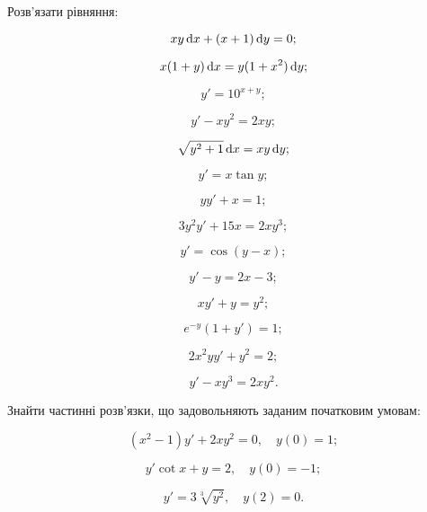 Розв'язати рівняння:
\begin{multicols}{2}
	\begin{problem}
		\[ x y \mathop{}\!\mathrm{d} x + (x + 1) \mathop{}\!\mathrm{d} y = 0; \]
	\end{problem}

	\begin{problem}
		\[ x (1 + y) \mathop{}\!\mathrm{d} x = y (1 + x^2) \mathop{}\!\mathrm{d} y; \]
	\end{problem}

	\begin{problem}
		\[ y' = 10^{x + y}; \]
	\end{problem}

	\begin{problem}
		\[ y' - x y^2 = 2 x y; \]
	\end{problem}

	\begin{problem}
		\[ \sqrt{y^2 + 1} \mathop{}\!\mathrm{d} x = x y \mathop{}\!\mathrm{d} y; \]
	\end{problem}

	\begin{problem}
		\[ y' = x \tan y; \]
	\end{problem}

	\begin{problem}
		\[ y y' + x = 1; \]
	\end{problem}

	\begin{problem}
		\[ 3 y^2 y' + 15 x = 2 x y^3; \]
	\end{problem}

	\begin{problem}
		\[ y' = \cos (y - x); \]
	\end{problem}

	\begin{problem}
		\[ y' - y = 2 x - 3; \]
	\end{problem}

	\begin{problem}
		\[ x y' + y = y^2; \]
	\end{problem}

	\begin{problem}
		\[ e^{-y} (1 + y') = 1; \]
	\end{problem}

	\begin{problem}
		\[ 2 x^2 y y' + y^2 = 2; \]
	\end{problem}

	\begin{problem}
		\[ y' - x y^3 = 2 x y^2. \]
	\end{problem}
\end{multicols}

Знайти частинні розв'язки, що задовольняють заданим початковим умовам:
\begin{problem}
	\[ (x^2 - 1) y' + 2 x y^2 = 0, \quad y(0) = 1; \]
\end{problem}

\begin{problem}
	\[ y' \cot x + y = 2, \quad y(0) = - 1; \]
\end{problem}

\begin{problem}
	\[ y' = 3 \sqrt[3]{y^2}, \quad y(2) = 0. \]
\end{problem}